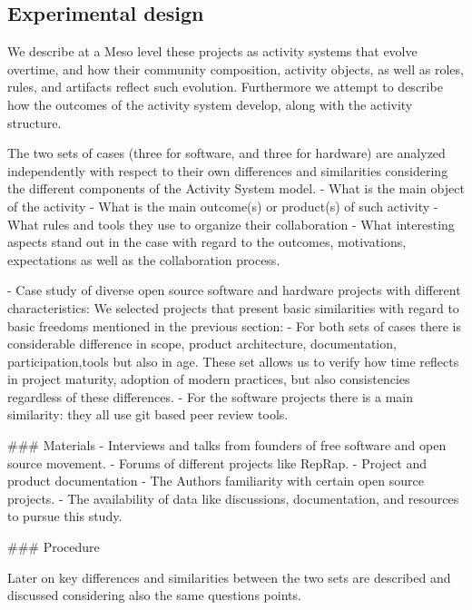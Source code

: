 \documentclass{ICED-Paper}%
\begin{document}
\subsection{Experimental design}

We describe at a Meso level these projects as activity  systems that evolve overtime, and how their community composition, activity objects, as well as roles, rules, and artifacts reflect such evolution. Furthermore we attempt to describe how the outcomes of the activity system develop, along with the activity structure.

The two sets of cases (three for software, and three for hardware) are analyzed independently with respect to their own differences and similarities considering the different components of the Activity System model.
- What is the main object of the activity
- What is the main outcome(s) or product(s) of such activity
- What rules and tools they use to organize their collaboration
- What interesting aspects stand out in the case with regard to the outcomes, motivations, expectations as well as the collaboration process.



- Case study of diverse open source software and hardware projects with different characteristics:
We selected projects that present basic similarities with regard to basic freedoms mentioned in the previous section:
- For both sets of cases there is considerable difference in scope, product architecture, documentation, participation,tools but also in age. These set allows us to verify how time reflects in project maturity, adoption of modern practices, but also consistencies regardless of these differences.
- For the software projects there is a main similarity: they all use git based peer review tools.

### Materials
- Interviews and talks from founders of free software and open source movement.
- Forums of different projects like RepRap.
- Project and product documentation
- The Authors familiarity with certain open source projects.
- The availability of data like discussions, documentation, and resources to pursue this study.

### Procedure

Later on key differences and similarities between the two sets are described and discussed considering also the same questions points.
\end{document}
